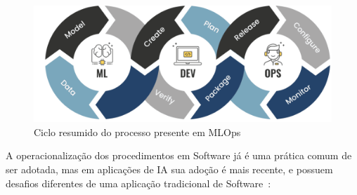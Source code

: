 \documentclass[portugues]{ic-tese}
\begin{document}
\begin{figure}[H]
\centering
\includegraphics[scale=0.7]{images/code-validate-deploy-loop.png}
\caption {Ciclo resumido do processo presente em MLOps~\citep{Tripathi_2021}}
\label{fig:MLOpsLoop}
\end{figure}

A operacionalização dos procedimentos em Software já é uma prática comum de ser adotada, mas em aplicações de IA sua adoção é mais recente, e possuem desafios diferentes de uma aplicação tradicional de Software~\cite{Sculley_2015}:
\end{document}
